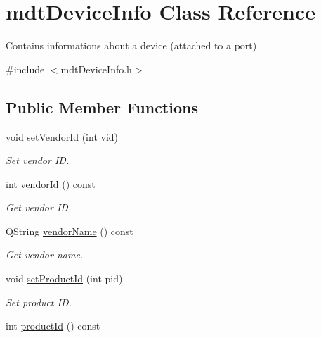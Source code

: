\hypertarget{classmdt_device_info}{
\section{mdtDeviceInfo Class Reference}
\label{classmdt_device_info}
}


Contains informations about a device (attached to a port)  




{\ttfamily \#include $<$mdtDeviceInfo.h$>$}

\subsection*{Public Member Functions}
\begin{DoxyCompactItemize}
\item 
\hypertarget{classmdt_device_info_a3b56cda14d31f3288353480a15731ebb}{
void \hyperlink{classmdt_device_info_a3b56cda14d31f3288353480a15731ebb}{setVendorId} (int vid)}
\label{classmdt_device_info_a3b56cda14d31f3288353480a15731ebb}

\begin{DoxyCompactList}\small\item\em Set vendor ID. \end{DoxyCompactList}\item 
\hypertarget{classmdt_device_info_a45edf71f1fa6a653c1bfa984e90e094e}{
int \hyperlink{classmdt_device_info_a45edf71f1fa6a653c1bfa984e90e094e}{vendorId} () const }
\label{classmdt_device_info_a45edf71f1fa6a653c1bfa984e90e094e}

\begin{DoxyCompactList}\small\item\em Get vendor ID. \end{DoxyCompactList}\item 
QString \hyperlink{classmdt_device_info_a207d7b6b49fd65726232e95cd9e0568c}{vendorName} () const 
\begin{DoxyCompactList}\small\item\em Get vendor name. \end{DoxyCompactList}\item 
\hypertarget{classmdt_device_info_a91ca6f02bfe86656073599c8d3d79da7}{
void \hyperlink{classmdt_device_info_a91ca6f02bfe86656073599c8d3d79da7}{setProductId} (int pid)}
\label{classmdt_device_info_a91ca6f02bfe86656073599c8d3d79da7}

\begin{DoxyCompactList}\small\item\em Set product ID. \end{DoxyCompactList}\item 
\hypertarget{classmdt_device_info_a53006d4fbaeb0ba2fd47057f36b9b813}{
int \hyperlink{classmdt_device_info_a53006d4fbaeb0ba2fd47057f36b9b813}{productId} () const }
\label{classmdt_device_info_a53006d4fbaeb0ba2fd47057f36b9b813}


\end{DoxyCompactItemize}
